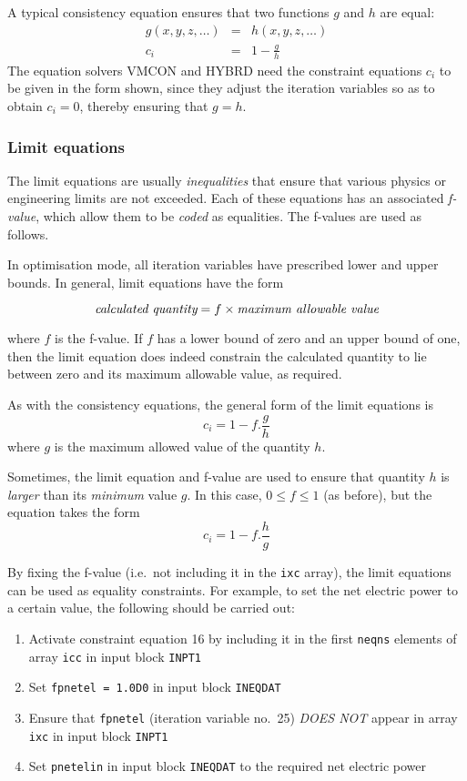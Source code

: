 A typical consistency equation ensures that two functions $g$ and $h$ are
equal:
\begin{eqnarray*}
g(x,y,z,\ldots) & = & h(x,y,z,\ldots) \\
c_i & = & 1 - \frac{g}{h}
\end{eqnarray*}
The equation solvers VMCON and HYBRD need the constraint equations $c_i$ to be
given in the form shown, since they adjust the iteration variables so as to
obtain $c_i = 0$, thereby ensuring that $g = h$.

\subsubsection{Limit equations}

The limit equations are usually {\em inequalities}\/ that ensure that various
physics or engineering limits are not exceeded. Each of these equations has an
associated {\em f-value}, which allow them to be {\em coded}\/ as
equalities. The f-values are used as follows.

In optimisation mode, all iteration variables have prescribed lower and upper
bounds. In general, limit equations have the form

\[ \mbox{\it calculated quantity} = f \times \mbox{\it maximum allowable
value} \]

where $f$ is the f-value. If $f$ has a lower bound of zero and an upper bound
of one, then the limit equation does indeed constrain the calculated quantity
to lie between zero and its maximum allowable value, as required.

As with the consistency equations, the general form of the limit equations is
\[ c_i = 1 - f.\frac{g}{h} \]
where $g$ is the maximum allowed value of the quantity $h$.

Sometimes, the limit equation and f-value are used to ensure that quantity $h$
is {\em larger}\/ than its {\em minimum}\/ value $g$. In this case, $0 \leq f
\leq 1$ (as before), but the equation takes the form
\[ c_i = 1 - f.\frac{h}{g} \]

By fixing the f-value (i.e.\ not including it in the {\tt ixc} array), the
limit equations can be used as equality constraints. For example, to set the
net electric power to a certain value, the following should be carried out:
\begin{enumerate}
\item
Activate constraint equation 16 by including it in the first {\tt neqns}
elements of array {\tt icc} in input block {\tt INPT1}
\item
Set {\tt fpnetel = 1.0D0} in input block {\tt INEQDAT}
\item
Ensure that {\tt fpnetel} (iteration variable no.\ 25) {\em DOES NOT}\/ appear
in array {\tt ixc} in input block {\tt INPT1}
\item
Set {\tt pnetelin} in input block {\tt INEQDAT} to the required net electric
power
\end{enumerate}

